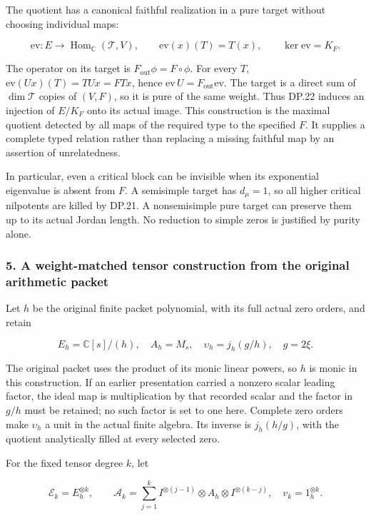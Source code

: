\documentclass{article}
\begin{document}
The quotient has a canonical faithful realization in a pure target without choosing individual maps:

\[
\mathrm{ev}:E\longrightarrow
 \operatorname{Hom}_{\mathbb C}(\mathscr T,V),
\qquad \mathrm{ev}(x)(T)=T(x),
\qquad \ker\mathrm{ev}=K_F.
\tag{DP.22}
\]

The operator on its target is \(F_{\mathrm{out}}\phi=F\circ\phi\). For every \(T\), \(\mathrm{ev}(Ux)(T)=TUx=FTx\), hence \(\mathrm{ev}\,U=F_{\mathrm{out}}\mathrm{ev}\). The target is a direct sum of \(\dim\mathscr T\) copies of \((V,F)\), so it is pure of the same weight. Thus DP.22 induces an injection of \(E/K_F\) onto its actual image. This construction is the maximal quotient detected by all maps of the required type to the specified \(F\). It supplies a complete typed relation rather than replacing a missing faithful map by an assertion of unrelatedness.

In particular, even a critical block can be invisible when its exponential eigenvalue is absent from \(F\). A semisimple target has \(d_\mu=1\), so all higher critical nilpotents are killed by DP.21. A nonsemisimple pure target can preserve them up to its actual Jordan length. No reduction to simple zeros is justified by purity alone.

\subsubsection{5. A weight-matched tensor construction from the original arithmetic packet}\label{endpoint-purity_review--a-weight-matched-tensor-construction-from-the-original-arithmetic-packet}

Let \(h\) be the original finite packet polynomial, with its full actual zero orders, and retain

\[
E_h=\mathbb C[s]/(h),\quad A_h=M_s,\quad
\upsilon_h=j_h(g/h),\quad g=2\xi.
\tag{DP.23}
\]

The original packet uses the product of its monic linear powers, so \(h\) is monic in this construction. If an earlier presentation carried a nonzero scalar leading factor, the ideal map is multiplication by that recorded scalar and the factor in \(g/h\) must be retained; no such factor is set to one here. Complete zero orders make \(\upsilon_h\) a unit in the actual finite algebra. Its inverse is \(j_h(h/g)\), with the quotient analytically filled at every selected zero.

For the fixed tensor degree \(k\), let

\[
\mathcal E_k=E_h^{\otimes k},\qquad
\mathcal A_k=\sum_{j=1}^k
 I^{\otimes(j-1)}\otimes A_h\otimes I^{\otimes(k-j)},
\quad v_k=1_h^{\otimes k}.
\tag{DP.24}
\]
\end{document}
